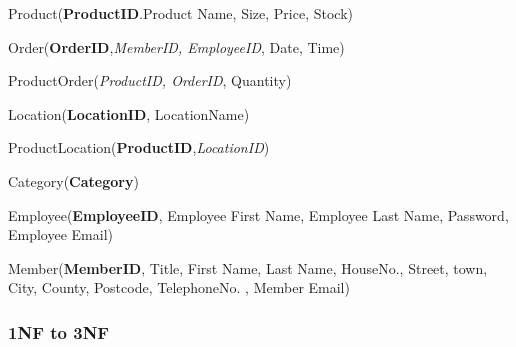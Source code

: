 \begin{python}
Product(\textbf{ProductID}.Product Name, Size, Price, Stock)

Order(\textbf{OrderID},\textit{MemberID, EmployeeID}, Date, Time)

ProductOrder(\textit{ProductID, OrderID}, Quantity)

Location(\textbf{LocationID}, LocationName)

ProductLocation(\textbf{ProductID},\textit{LocationID})

Category(\textbf{Category})

Employee(\textbf{EmployeeID}, Employee First Name, Employee Last Name, Password, Employee Email)

Member(\textbf{MemberID}, Title, First Name, Last Name, HouseNo., Street, town, City, County, Postcode, TelephoneNo. , Member Email)

\pagebreak

\subsubsection{1NF to 3NF}




\end{python}
